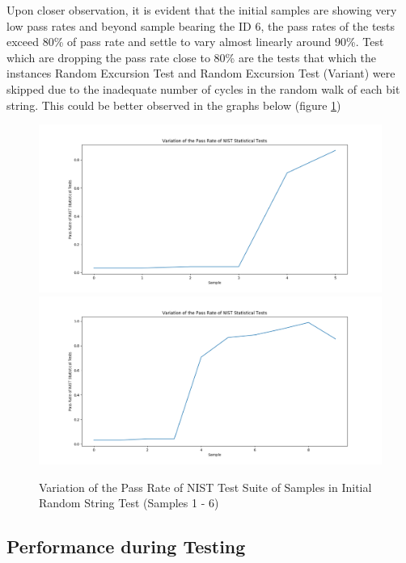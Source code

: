 Upon closer observation, it is evident that the initial samples are showing very low pass rates and beyond sample bearing the ID 6, the pass rates of the tests exceed 80\% of pass rate and settle to vary almost linearly around 90\%. Test which are dropping the pass rate close to 80\% are the tests that which the instances Random Excursion Test and Random Excursion Test (Variant) were skipped due to the inadequate number of cycles in the random walk of each bit string. This could be better observed in the graphs below (figure \ref{fig:4_nist_init_samples})

\begin{figure}[h!]
    \includegraphics[width=1.0\textwidth]{images/pass_rates_nist_init_sample_1_6.png}
    \includegraphics[width=1.0\textwidth]{images/pass_rates_nist_init_sample_1_10.png}
    \centering
    \caption{Variation of the Pass Rate of NIST Test Suite of Samples in Initial Random String Test (Samples 1 - 6)}
    \label{fig:4_nist_init_samples}
\end{figure}

\subsection{Performance during Testing}

